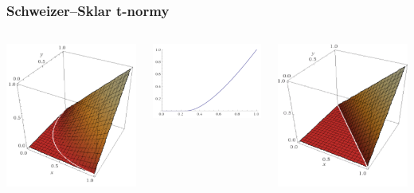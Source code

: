 \documentclass{beamer}
\begin{document}
\begin{frame}
\frametitle{Schweizer–Sklar t-normy}
\begin{columns}
\begin{minipage}[c][0.4\textheight][c]{\linewidth}
  \centering
  \includegraphics[width=0.5\linewidth]{SS0_2}
\end{minipage}
\begin{minipage}[c][0.4\textheight][c]{\linewidth}
  \centering
  \includegraphics[width=0.7\linewidth]{SS0_2-diag}
\end{minipage}
\begin{minipage}[c][0.4\textheight][c]{\linewidth}
  \centering
  \includegraphics[width=0.5\linewidth]{SS1-luka}

\end{minipage}
\end{columns}
\end{frame}
\end{document}
